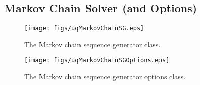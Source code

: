 \clearpage
\subsection{Markov Chain Solver (and Options)}

\begin{figure}[h!]
\centerline{
\texttt{[image: figs/uqMarkovChainSG.eps]}
}
\caption{
The Markov chain sequence generator class.
}
\label{fig-markov-chain-solver-class}
\end{figure}

\begin{figure}[h!]
\begin{center}
\texttt{[image: figs/uqMarkovChainSGOptions.eps]}
\end{center}
\caption{
The Markov chain sequence generator options class.
}
\label{fig-markov-options-class}
\end{figure}


